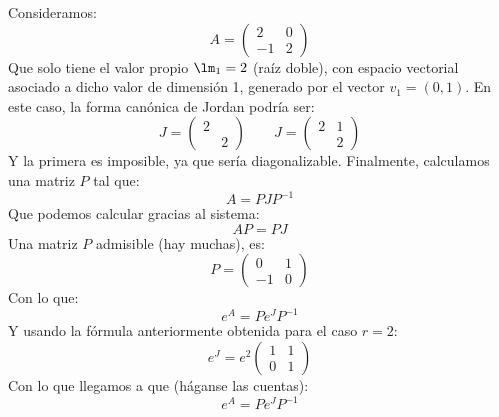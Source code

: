 \begin{ejemplo}
    Consideramos:
    \begin{equation*}
        A = \left(\begin{array}{cc}
                2 & 0 \\
                -1 & 2
        \end{array}\right)
    \end{equation*}
    Que solo tiene el valor propio $\lm_1=2$ (raíz doble), con espacio vectorial asociado a dicho valor de dimensión 1, generado por el vector $v_1=(0,1)$. En este caso, la forma canónica de Jordan podría ser:
    \begin{equation*}
        J = \left(\begin{array}{cc}
                2 & \\
                   & 2
        \end{array}\right)  \qquad 
        J = \left(\begin{array}{cc}
                2 & 1\\
                   & 2
        \end{array}\right) 
    \end{equation*}
    Y la primera es imposible, ya que sería diagonalizable. Finalmente, calculamos una matriz $P$ tal que:
    \begin{equation*}
        A = P J P^{-1}
    \end{equation*}
    Que podemos calcular gracias al sistema:
    \begin{equation*}
        AP = PJ
    \end{equation*}
    Una matriz $P$ admisible (hay muchas), es:
    \begin{equation*}
        P = \left(\begin{array}{cc}
                0 & 1 \\
                -1 & 0
        \end{array}\right)
    \end{equation*}
    Con lo que:
    \begin{equation*}
        e^A = Pe^J P^{-1}
    \end{equation*}
    Y usando la fórmula anteriormente obtenida para el caso $r=2$:
    \begin{equation*}
        e^J = e^2 \left(\begin{array}{cc}
                1 & 1 \\
                0 & 1
        \end{array}\right)
    \end{equation*}
    Con lo que llegamos a que (háganse las cuentas):
    \begin{equation*}
        e^A = P e^J P^{-1}
    \end{equation*}
\end{ejemplo}

